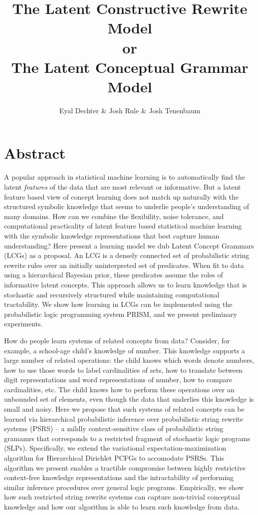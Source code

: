 \documentclass{article}
\title{The Latent Constructive Rewrite Model \\ or \\ The Latent Conceptual Grammar Model}
\author{Eyal Dechter \& Josh Rule \& Josh Tenenbaum}
\begin{document}
\maketitle

\section{Abstract}
A popular approach in statistical machine learning is to automatically
find the latent \emph{features} of the data that are most relevant or
informative. But a latent feature based view of concept learning does
not match up naturally with the structured symbolic knowledge that
seems to underlie people's understanding of many domains. How can we
combine the flexibility, noise tolerance, and computational
practicality of latent feature based statistical machine learning with
the symbolic knowledge representations that best capture human
understanding? Here present a learning model we dub Latent Concept
Grammars (LCGs) as a proposal. An LCG is a densely connected set of
probabilistic string rewrite rules over an initially uninterpreted set
of predicates. When fit to data using a hierarchical Bayesian prior,
these predicates assume the roles of informative latent concepts. This
approach allows us to learn knowledge that is stochastic and
recursively structured while maintaining computational
tractability. We show how learning in LCGs can be implemented using
the probabilistic logic programming system PRISM, and we present
preliminary experiments.

How do people learn systems of related concepts from
data?  Consider, for example, a school-age child's knowledge of
number. This knowledge supports a large number of related operations:
the child knows which words denote numbers, how to use those words to
label cardinalities of sets, how to translate between digit
representations and word representations of number, how to compare
cardinalities, etc. The child knows how to perform these operations
over an unbounded set of elements, even though the data that underlies
this knowledge is small and noisy. Here we propose that such systems
of related concepts can be learned via hierarchical probabilistic
inference over probabilistic string rewrite systems (PSRS) -- a mildly
context-sensitive class of probabilistic string gramamrs that
corresponds to a restricted fragment of stochastic logic programs
(SLPs). Specifically, we extend the variational
expectation-maximization algorithm for Hierarchical Dirichlet PCFGs to
accomodate PSRSs. This algorithm we present enables a tractible
compromise between highly restrictive context-free knowledge
representations and the intractability of performing similar inference
procedures over general logic programs. Empirically, we show how such
restricted string rewrite systems can capture non-trivial conceptual
knowledge and how our algorithm is able to learn such knowledge from
data.
\end{document}
